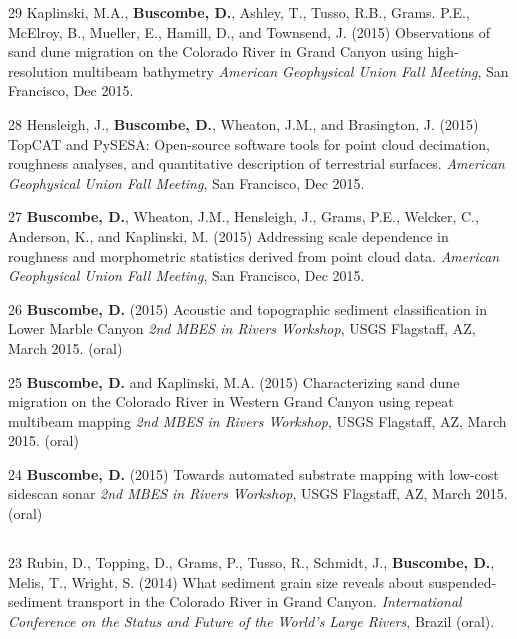 \documentclass[margin,line]{resume}
\begin{document}
\begin{resume}
\begin{footnotesize}
\begin{list1}
        \item[29] Kaplinski, M.A., {\bf Buscombe, D.}, Ashley, T., Tusso, R.B., Grams. P.E., McElroy, B., Mueller, E., Hamill, D., and Townsend, J. (2015) Observations of sand dune migration on the Colorado River in Grand Canyon using high-resolution multibeam bathymetry {\sl American Geophysical Union Fall Meeting}, San Francisco, Dec 2015.\\

        \item[28] Hensleigh, J., {\bf Buscombe, D.}, Wheaton, J.M., and Brasington, J. (2015) TopCAT and PySESA: Open-source software tools for point cloud decimation, roughness analyses, and quantitative description of terrestrial surfaces. {\sl American Geophysical Union Fall Meeting}, San Francisco, Dec 2015.\\  
        
        \item[27] {\bf Buscombe, D.}, Wheaton, J.M., Hensleigh, J., Grams, P.E., Welcker, C., Anderson, K., and Kaplinski, M. (2015) Addressing scale dependence in roughness and morphometric statistics derived from point cloud data. {\sl American Geophysical Union Fall Meeting}, San Francisco, Dec 2015.\\    
        
        \item[26] {\bf Buscombe, D.} (2015) Acoustic and topographic sediment classification in Lower Marble Canyon {\sl 2nd MBES in Rivers Workshop}, USGS Flagstaff, AZ, March 2015. (oral)\\
        
        \item[25] {\bf Buscombe, D.} and Kaplinski, M.A. (2015) Characterizing sand dune migration on the Colorado River in Western Grand Canyon using repeat multibeam mapping {\sl 2nd MBES in Rivers Workshop}, USGS Flagstaff, AZ, March 2015. (oral)\\

        \item[24] {\bf Buscombe, D.} (2015) Towards automated substrate mapping with low-cost sidescan sonar {\sl 2nd MBES in Rivers Workshop}, USGS Flagstaff, AZ, March 2015. (oral)
        
	\end{list1}

	\subsection{}
	\begin{list1}
        \item[23] Rubin, D., Topping, D., Grams, P., Tusso, R., Schmidt, J., {\bf Buscombe, D.}, Melis, T., Wright, S. (2014) What sediment grain size reveals about suspended-sediment transport in the Colorado River in Grand Canyon. {\sl International Conference on the Status and Future of the World's Large Rivers}, Brazil (oral).\\


\end{list1}
\end{footnotesize}
\end{resume}
\end{document}
